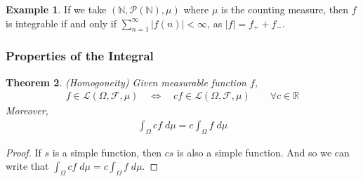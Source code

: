 \documentclass[12pt]{article}
\theoremstyle{plain}
\newtheorem{thm}{Theorem}[section]
\theoremstyle{definition}
\newtheorem{ex}[thm]{Example}
\theoremstyle{remark}
\newcommand{\sF}{\mathscr{F}}
\begin{document}
\begin{ex}
If we take $(\mathbb{N}, \mathscr{P}(\mathbb{N}), \mu)$ where $\mu$ is
the counting measure, then $f$ is integrable if and only if
$\sum^\infty_{n=1}|f(n)|<\infty$, as $|f| = f_+ + f_-$.
\end{ex}

\clearpage
\subsubsection{Properties of the Integral}

\begin{thm}\emph{(Homogoneity)}
Given measurable function $f$,
\begin{align*}
  f\in\mathscr{L}(\Omega,\sF,\mu)
  \quad\iff\quad
  cf\in\mathscr{L}(\Omega,\sF,\mu)
  \qquad\forall c\in\mathbb{R}
\end{align*}
Moreover,
\begin{align*}
  \int_\Omega cf\;d\mu = c\int_\Omega f\;d\mu
\end{align*}
\end{thm}
\begin{proof}
If $s$ is a simple function, then $cs$ is also a simple function. And so
we can write that $\int_\Omega cf \; d\mu = c\int_\Omega f \; d\mu$.
\end{proof}
\end{document}
